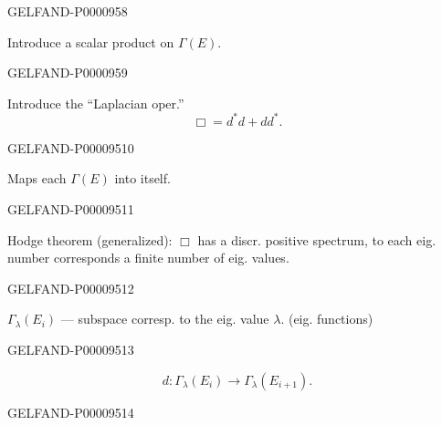 \begin{GelfandAdjacentEvidence}{GELFAND-P000095}{8}

Introduce a scalar product on $\Gamma(E)$.
\end{GelfandAdjacentEvidence}
\begin{GelfandAdjacentEvidence}{GELFAND-P000095}{9}

Introduce the “Laplacian oper.”
\begin{equation*}\Box=d^*d+dd^*.\end{equation*}
\end{GelfandAdjacentEvidence}
\begin{GelfandAdjacentEvidence}{GELFAND-P000095}{10}

Maps each $\Gamma(E)$ into itself.
\end{GelfandAdjacentEvidence}
\begin{GelfandAdjacentEvidence}{GELFAND-P000095}{11}

Hodge theorem (generalized): $\Box$ has a discr. positive
spectrum, to each eig. number corresponds a finite number of eig. values.
\end{GelfandAdjacentEvidence}
\begin{GelfandAdjacentEvidence}{GELFAND-P000095}{12}

$\Gamma_\lambda(E_i)$ — subspace corresp. to the eig. value $\lambda$. (eig. functions)
\end{GelfandAdjacentEvidence}
\begin{GelfandAdjacentEvidence}{GELFAND-P000095}{13}

\begin{equation*}d:\Gamma_\lambda(E_i)\longrightarrow\Gamma_\lambda(E_{i+1}).\end{equation*}
\end{GelfandAdjacentEvidence}
\begin{GelfandAdjacentEvidence}{GELFAND-P000095}{14}

\begin{center}
\end{center}
\end{GelfandAdjacentEvidence}
